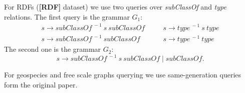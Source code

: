 For RDFs (\textbf{[RDF]} dataset) we use two queries over \textit{subClassOf} and \textit{type} relations.
The first query is the grammar $G_1$:
\[
 \begin{array}{lcl}
   s  \rightarrow \textit{subClassOf}^{\ -1} \ s \ \textit{subClassOf}   & \quad & s  \rightarrow \textit{type}^{\ -1} \ s \ \textit{type}     \\
   s  \rightarrow \textit{subClassOf}^{\ -1} \ \textit{subClassOf}       & \quad & s  \rightarrow  \textit{type}^{\ -1}  \ \textit{type}

 \end{array}
 \]
The second one is the grammar $G_2$: $$s \rightarrow \textit{subClassOf}^{\ -1} \ s \ \textit{subClassOf} \mid  \textit{subClassOf}.$$

For geospecies and free scale graphs querying we use same-generation queries form the original paper.
